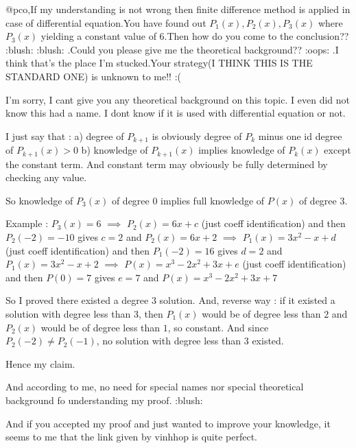 \begin{solution}
	\begin{tcolorbox}  @pco,If my understanding is not wrong then finite difference method is applied in case of differential equation.You have found out $ P_1(x),P_2(x),P_3(x)$ where $ P_3(x)$ yielding a constant value of 6.Then how do you come to the conclusion?? :blush:  :blush: .Could you please give me the theoretical background?? :oops: .I think that's the place I'm stucked.Your strategy(I THINK THIS IS THE STANDARD ONE) is unknown to me!! :(\end{tcolorbox}

I'm sorry, I cant give you any theoretical background on this topic. I even did not know this had a name. I dont know if it is used with differential equation or not.

I just say that :
a) degree of $ P_{k + 1}$ is obviously degree of $ P_{k}$ minus one id degree of $ P_{k+1}(x) > 0$
b) knowledge of $ P_{k + 1}(x)$ implies knowledge of $ P_k(x)$ except the constant term. And constant term may obviously be fully determined by checking any value.

So knowledge of  $ P_3(x)$ of degree $ 0$ implies full knowledge of $ P(x)$ of degree $ 3$.

Example :
$ P_3(x) = 6$
$ \implies$ $ P_2(x) = 6x + c$ (just coeff identification) and then $ P_2( - 2) = - 10$ gives $ c = 2$ and $ P_2(x) = 6x + 2$
$ \implies$ $ P_1(x) = 3x^2 - x + d$ (just coeff identification) and then $ P_1( - 2) = 16$ gives $ d = 2$ and $ P_1(x) = 3x^2 - x + 2$
$ \implies$ $ P(x) = x^3 - 2x^2 + 3x + e$ (just coeff identification) and then $ P(0) = 7$ gives $ e = 7$ and $ P(x) = x^3 - 2x^2 + 3x + 7$

So I proved there existed a degree $ 3$ solution.
And, reverse way : if it existed a solution with degree less than $ 3$, then $ P_1(x)$ would be of degree less than $ 2$ and $ P_2(x)$ would be of degree less than $ 1$, so constant. And since $ P_2( - 2)\ne P_2( - 1)$, no solution with degree less than $ 3$ existed.

Hence my claim.

And according to me, no need for special names nor special theoretical background fo understanding my proof.  :blush: 

And if you accepted my proof and just wanted to improve your knowledge, it seems to me that the link given by vinhhop is quite perfect.
\end{solution}



